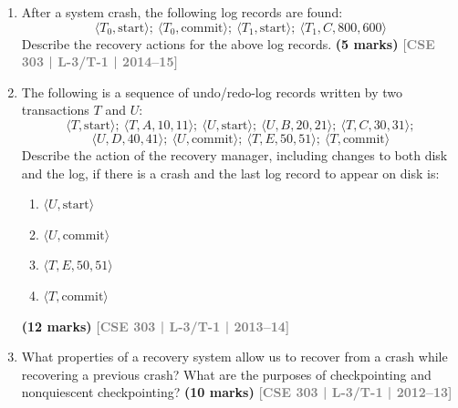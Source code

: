 \documentclass[12pt,a3paper]{article}
\newcommand{\yr}[1]{\hfill\textcolor{gray}{\small\textbf{[#1]}}}
\newcommand{\mk}[1]{\textcolor{orange!70!black}{\small\textbf{(#1 marks)}}}
\begin{document}
\begin{enumerate}
\begin{enumerate}
  \item Write log records for the above transactions.
  \item Show the log-based recovery if a failure occurs after WRITE($A_3$).
  \item Show the recovery if a failure occurs after WRITE($A_2$).
\end{enumerate}
\mk{15} \yr{CSE 303 | L-3/T-1 | 2015--16}

\item After a system crash, the following log records are found:
\[\langle T_0,\text{start}\rangle;\ \langle T_0,\text{commit}\rangle;\ \langle T_1,\text{start}\rangle;\ \langle T_1,C,800,600\rangle\]
Describe the recovery actions for the above log records.
\mk{5} \yr{CSE 303 | L-3/T-1 | 2014--15}

\item The following is a sequence of undo/redo-log records written by two transactions $T$ and $U$:
\[\langle T,\text{start}\rangle;\ \langle T,A,10,11\rangle;\ \langle U,\text{start}\rangle;\ \langle U,B,20,21\rangle;\ \langle T,C,30,31\rangle;\]
\[\langle U,D,40,41\rangle;\ \langle U,\text{commit}\rangle;\ \langle T,E,50,51\rangle;\ \langle T,\text{commit}\rangle\]
Describe the action of the recovery manager, including changes to both disk and the log, if there is a crash and the last log record to appear on disk is:
\begin{enumerate}
  \item $\langle U,\text{start}\rangle$
  \item $\langle U,\text{commit}\rangle$
  \item $\langle T,E,50,51\rangle$
  \item $\langle T,\text{commit}\rangle$
\end{enumerate}
\mk{12} \yr{CSE 303 | L-3/T-1 | 2013--14}

\item What properties of a recovery system allow us to recover from a crash while recovering a previous crash? What are the purposes of checkpointing and nonquiescent checkpointing?
\mk{10} \yr{CSE 303 | L-3/T-1 | 2012--13}


\end{enumerate}
\end{document}
